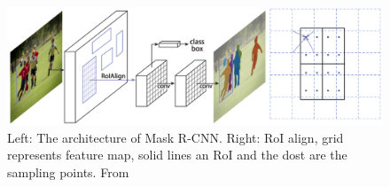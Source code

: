  \begin{figure}
     \centering
     \includegraphics[width=\textwidth]{img/maskrcnn}
     \caption{Left: The architecture of Mask R-CNN. Right: RoI align, grid represents feature map, solid lines an RoI and the dost are the sampling points. From \cite[fig. 1, 3]{bib:maskrcnn}}
     \label{fig:maskrcnn}
 \end{figure}



